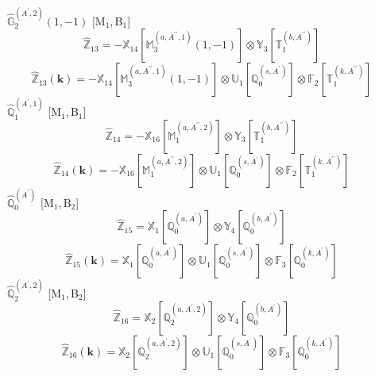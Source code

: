 \documentclass[fleqn,10pt,landscape]{article}
\begin{document}
\begin{itemize}
\begin{dmath*}
\end{dmath*}
\vspace{4mm}
\noindent {} $\,\,\,\hat{\mathbb{G}}_{2}^{(A^{\prime},2)}(1,-1)$ [M$_{1}$,\,B$_{1}$]
\begin{dmath*}
\hat{\mathbb{Z}}_{13}=- \mathbb{X}_{14}[\mathbb{M}_{3}^{(a,A^{\prime\prime},1)}(1,-1)] \otimes\mathbb{Y}_{3}[\mathbb{T}_{1}^{(b,A^{\prime\prime})}]
\end{dmath*}
\begin{dmath*}
\hat{\mathbb{Z}}_{13}(\bm{k})=- \mathbb{X}_{14}[\mathbb{M}_{3}^{(a,A^{\prime\prime},1)}(1,-1)] \otimes\mathbb{U}_{1}[\mathbb{Q}_{0}^{(s,A^{\prime})}] \otimes\mathbb{F}_{2}[\mathbb{T}_{1}^{(k,A^{\prime\prime})}]
\end{dmath*}
\vspace{4mm}
\noindent {} $\,\,\,\hat{\mathbb{Q}}_{1}^{(A^{\prime},1)}$ [M$_{1}$,\,B$_{1}$]
\begin{dmath*}
\hat{\mathbb{Z}}_{14}=- \mathbb{X}_{16}[\mathbb{M}_{1}^{(a,A^{\prime\prime},2)}] \otimes\mathbb{Y}_{3}[\mathbb{T}_{1}^{(b,A^{\prime\prime})}]
\end{dmath*}
\begin{dmath*}
\hat{\mathbb{Z}}_{14}(\bm{k})=- \mathbb{X}_{16}[\mathbb{M}_{1}^{(a,A^{\prime\prime},2)}] \otimes\mathbb{U}_{1}[\mathbb{Q}_{0}^{(s,A^{\prime})}] \otimes\mathbb{F}_{2}[\mathbb{T}_{1}^{(k,A^{\prime\prime})}]
\end{dmath*}
\vspace{4mm}
\noindent {} $\,\,\,\hat{\mathbb{Q}}_{0}^{(A^{\prime})}$ [M$_{1}$,\,B$_{2}$]
\begin{dmath*}
\hat{\mathbb{Z}}_{15}=\mathbb{X}_{1}[\mathbb{Q}_{0}^{(a,A^{\prime})}] \otimes\mathbb{Y}_{4}[\mathbb{Q}_{0}^{(b,A^{\prime})}]
\end{dmath*}
\begin{dmath*}
\hat{\mathbb{Z}}_{15}(\bm{k})=\mathbb{X}_{1}[\mathbb{Q}_{0}^{(a,A^{\prime})}] \otimes\mathbb{U}_{1}[\mathbb{Q}_{0}^{(s,A^{\prime})}] \otimes\mathbb{F}_{3}[\mathbb{Q}_{0}^{(k,A^{\prime})}]
\end{dmath*}
\vspace{4mm}
\noindent {} $\,\,\,\hat{\mathbb{Q}}_{2}^{(A^{\prime},2)}$ [M$_{1}$,\,B$_{2}$]
\begin{dmath*}
\hat{\mathbb{Z}}_{16}=\mathbb{X}_{2}[\mathbb{Q}_{2}^{(a,A^{\prime},2)}] \otimes\mathbb{Y}_{4}[\mathbb{Q}_{0}^{(b,A^{\prime})}]
\end{dmath*}
\begin{dmath*}
\hat{\mathbb{Z}}_{16}(\bm{k})=\mathbb{X}_{2}[\mathbb{Q}_{2}^{(a,A^{\prime},2)}] \otimes\mathbb{U}_{1}[\mathbb{Q}_{0}^{(s,A^{\prime})}] \otimes\mathbb{F}_{3}[\mathbb{Q}_{0}^{(k,A^{\prime})}]

\end{dmath*}
\end{itemize}
\end{document}
